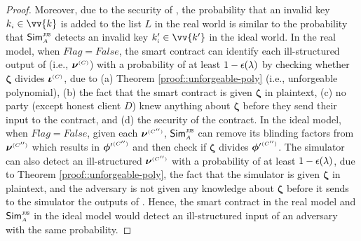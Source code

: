 \begin{proof}
Moreover, due to the security of \zspaa, the probability that an invalid key $k_{\st i}\in \vv{k}$ is added to the list $  L$ in the real world is similar to the probability that  $\mathsf{Sim}^{\scriptscriptstyle \mathtt{JUS}}_{\scriptscriptstyle A}$ detects an invalid key $  k'_{\st i}\in \vv{k'}$ in the ideal world. In the real model, when $Flag=False$, the smart contract can identify each ill-structured output of \vopr (i.e.,  $\bm\nu^{ \scriptscriptstyle {  {(C)}} }$) with a probability of at least $1-\epsilon(\lambda)$ by checking whether $\bm\zeta$  divides $\bm\iota^{ \scriptscriptstyle {  {(C)}}}$, due to  (a) Theorem \ref{proof::unforgeable-poly} (i.e., unforgeable polynomial), (b) the fact that the smart contract is given $\bm \zeta$ in plaintext, (c) no party (except honest client $D$) knew anything about $\bm \zeta$ before they send their input to the contract, and (d) the security of the contract. In the ideal model, when $Flag=False$, given each $ {\bm\nu}^{ \scriptscriptstyle {  {(C'')}} }$, $\mathsf{Sim}^{\scriptscriptstyle \mathtt{JUS}}_{\scriptscriptstyle A}$ can remove its blinding factors from  $ {\bm\nu}^{ \scriptscriptstyle {  {(C'')}} }$ which results in $ {\bm\phi'}^{ \scriptscriptstyle {  {(C'')}} }$ and then check if $ {\bm\zeta}$  divides $ {\bm\phi'}^{ \scriptscriptstyle {  {(C'')}} }$. The simulator can also detect an ill-structured  $ {\bm\nu}^{ \scriptscriptstyle {  {(C'')}} }$ with a probability of at least $1-\epsilon(\lambda)$, due to Theorem \ref{proof::unforgeable-poly}, the fact that the simulator is given $ {\bm \zeta}$ in plaintext,  and the adversary is not given any knowledge about $ {\bm \zeta}$ before it sends to the simulator the outputs of \vopr.  Hence, the smart contract in the real model and $\mathsf{Sim}^{\scriptscriptstyle \mathtt{JUS}}_{\scriptscriptstyle A}$ in the ideal model would detect an ill-structured input of an adversary with the same probability. 




\end{proof}
